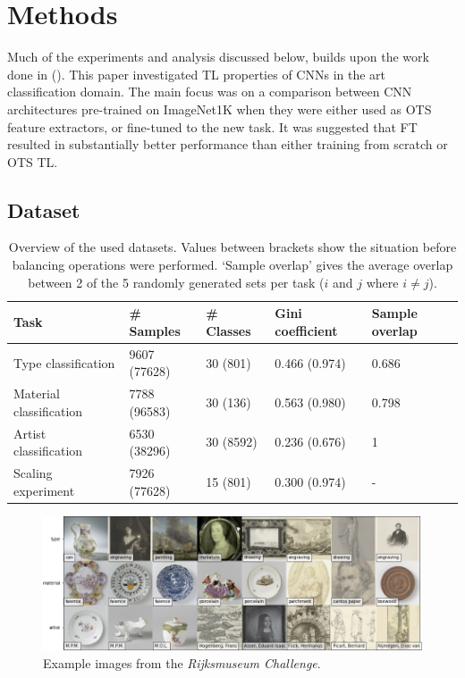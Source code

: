 \section{Methods}

Much of the experiments and analysis discussed below, builds upon the work done in \citeauthor{sabatelli2018deep} (\citeyear{sabatelli2018deep}). This paper investigated TL properties of CNNs in the art classification domain. The main focus was on a comparison between CNN architectures pre-trained on ImageNet1K when they were either used as OTS feature extractors, or fine-tuned to the new task. It was suggested that FT resulted in substantially better performance than either training from scratch or OTS TL.

\subsection{Dataset} \label{methods:dataset}

\begin{table}[tb]
\centering
\small
\begin{tabular}{lllll}
\hline
\textbf{Task} & \textbf{\# Samples} & \textbf{\# Classes} & \textbf{Gini coefficient} & \textbf{Sample overlap} \\ \hline
Type classification & 9607 (77628) & 30 (801) & 0.466 (0.974) & 0.686 \\
Material classification & 7788 (96583) & 30 (136) & 0.563 (0.980) & 0.798 \\
Artist classification & 6530 (38296) & 30 (8592) & 0.236 (0.676) & 1 \\
Scaling experiment & 7926 (77628) & 15 (801) & 0.300 (0.974) & - \\ \hline
\end{tabular}
\caption{Overview of the used datasets. Values between brackets show the situation before balancing operations were performed. `Sample overlap' gives the average overlap between 2 of the 5 randomly generated sets per task ($i$ and $j$ where $i \neq j$).}
\label{methods:datasets}
\end{table}

\begin{figure}[tb]
\includegraphics[width=\textwidth]{img/examples.png}
\caption{Example images from the \textit{Rijksmuseum Challenge}.}
\label{methods:eg}
\end{figure}

